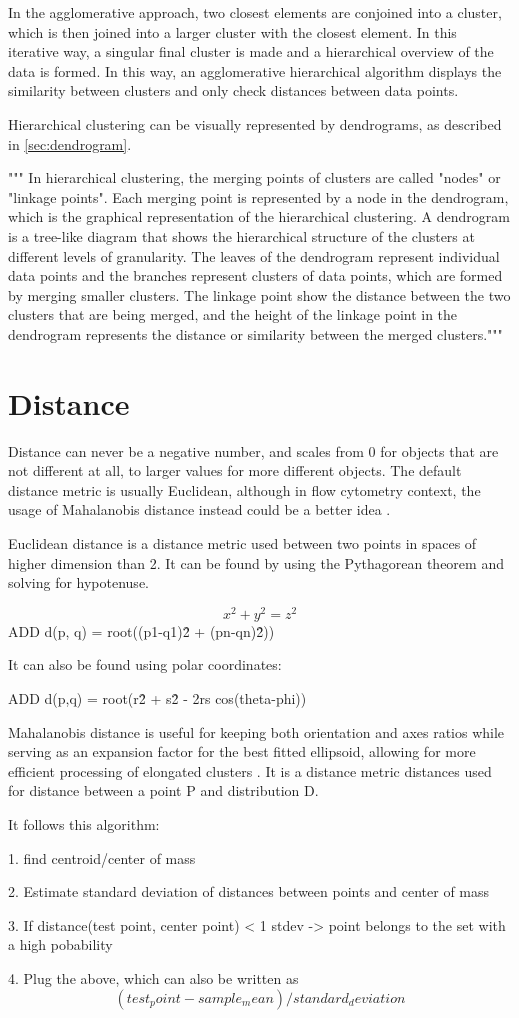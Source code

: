 In the agglomerative approach, two closest elements are conjoined into a cluster, which is then joined into a larger cluster with the closest element. In this iterative way, a singular final cluster is made and a hierarchical overview of the data is formed. In this way, an agglomerative hierarchical algorithm displays the similarity between clusters and only check distances between data points.

Hierarchical clustering can be visually represented by dendrograms, as described in \ref{sec:dendrogram}.


"""
In hierarchical clustering, the merging points of clusters are called "nodes" or "linkage points".
Each merging point is represented by a node in the dendrogram, which is the graphical representation of the hierarchical clustering.
A dendrogram is a tree-like diagram that shows the hierarchical structure of the clusters at different levels of granularity. The leaves of the dendrogram represent individual data points and the branches represent clusters of data points, which are formed by merging smaller clusters.
The linkage point show the distance between the two clusters that are being merged, and the height of the linkage point in the dendrogram represents the distance or similarity between the merged clusters."""

\section{Distance}
\label{sec:distance}
Distance can never be a negative number, and scales from 0 for objects that are not different at all, to larger values for more different objects. The default distance metric is usually Euclidean, although in flow cytometry context, the usage of Mahalanobis distance instead could be a better idea \cite{fivser2012detection}.

Euclidean distance is a distance metric used between two points in spaces of higher dimension than 2. It can be found by using the Pythagorean theorem and solving for hypotenuse. 


 \[ x^2 + y^2= z^2 \]
 ADD d(p, q) = root((p1-q1)\^2 + (pn-qn)\^2))

 It can also be found using polar coordinates:

 ADD d(p,q) = root(r\^2 + s\^2 - 2rs cos(theta-phi)) 

Mahalanobis distance is useful for keeping both orientation and axes ratios while serving as an expansion factor for the best fitted ellipsoid, allowing for more efficient processing of elongated clusters \cite{zamir2005resolving}. It is a distance metric distances used for distance between a point P and distribution D. 

It follows this algorithm:

1. find centroid/center of mass

2. Estimate standard deviation of distances between points and center of mass

3. If distance(test point, center point) < 1 stdev -> point belongs to the set with a high pobability

4. Plug the above, which can also be written as 
\[(test_point - sample_mean)/standard_deviation\]
